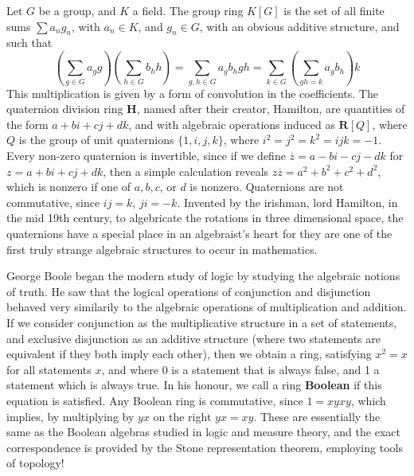 \begin{example}
    Let $G$ be a group, and $K$ a field. The group ring $K[G]$ is the set of all finite sums $\sum a_ng_n$, with $a_n \in K$, and $g_n \in G$, with an obvious additive structure, and such that
    \[ \left( \sum_{g \in G} a_g g \right) \left( \sum_{h \in G} b_h h \right) = \sum_{g,h \in G} a_g b_h gh = \sum_{k \in G} \left( \sum_{gh = k} a_g b_h \right) k \]
    This multiplication is given by a form of convolution in the coefficients. The quaternion division ring $\mathbf{H}$, named after their creator, Hamilton, are quantities of the form $a + bi + cj + dk$, and with algebraic operations induced as $\mathbf{R}[Q]$, where $Q$ is the group of unit quaternions $\{ 1, i, j, k \}$, where $i^2 = j^2 = k^2 = ijk = -1$. Every non-zero quaternion is invertible, since if we define $\overline{z} = a - bi - cj - dk$ for $z = a + bi + cj + dk$, then a simple calculation reveals $z\overline{z} = a^2 + b^2 + c^2 + d^2$, which is nonzero if one of $a,b,c$, or $d$ is nonzero. Quaternions are not commutative, since $ij = k$, $ji = -k$. Invented by the irishman, lord Hamilton, in the mid 19th century, to algebricate the rotations in three dimensional space, the quaternions have a special place in an algebraist's heart for they are one of the first truly strange algebraic structures to occur in mathematics.
\end{example}

\begin{example}
    George Boole began the modern study of logic by studying the algebraic notions of truth. He saw that the logical operations of conjunction and disjunction behaved very similarily to the algebraic operations of multiplication and addition. If we consider conjunction as the multiplicative structure in a set of statements, and exclusive disjunction as an additive structure (where two statements are equivalent if they both imply each other), then we obtain a ring, satisfying $x^2 = x$ for all statements $x$, and where 0 is a statement that is always false, and 1 a statement which is always true. In his honour, we call a ring {\bf Boolean} if this equation is satisfied. Any Boolean ring is commutative, since $1 = xyxy$, which implies, by multiplying by $yx$ on the right $yx = xy$. These are essentially the same as the Boolean algebras studied in logic and measure theory, and the exact correspondence is provided by the Stone representation theorem, employing tools of topology!
\end{example}

